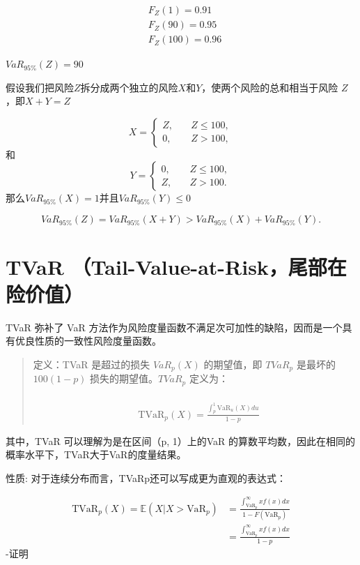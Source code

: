 \documentclass[
]{book}
\begin{document}
\[
\begin{align*}
&F_Z(1) = 0.91 \\
& F_Z(90) =  0.95\\
& F_Z(100) =  0.96
\end{align*}
\]

\(VaR_{95\%}(Z) = 90\)

假设我们把风险\(Z\)拆分成两个独立的风险\(X\)和\(Y\)，使两个风险的总和相当于风险 \(Z\)，即\(X+Y=Z\)

\[
X=\begin{cases}
Z, & \quad Z\le 100,\\
0, & \quad Z> 100,
\end{cases}
\] 和 \[
Y=\begin{cases}
0, & \quad Z\le 100,\\
Z, & \quad Z> 100.
\end{cases}
\] 那么\(VaR_{95\%}(X) = 1\)并且\(VaR_{95\%}(Y) \le 0\)

\[
VaR_{95\%}(Z) = VaR_{95\%}(X+Y) > VaR_{95\%}(X) + VaR_{95\%}(Y).
\]

\hypertarget{tvar-tail-value-at-riskux5c3eux90e8ux5728ux9669ux4ef7ux503c}{%
\section{TVaR （Tail-Value-at-Risk，尾部在险价值）}\label{tvar-tail-value-at-riskux5c3eux90e8ux5728ux9669ux4ef7ux503c}}

TVaR 弥补了 VaR 方法作为风险度量函数不满足次可加性的缺陷，因而是一个具有优良性质的一致性风险度量函数。

\begin{quote}
定义：TVaR 是超过的损失 \(VaR_p(X)\) 的期望值，即 \(TVaR_p\) 是最坏的 \(100(1-p)%
\) 损失的期望值。\(TVaR_p\) 定义为：

\[
\begin{align*}
&  \\ 
& \text{TVa}{{\text{R}}_{p}}(X)=\frac{\int_{p}^{1}{\text{Va}{{\text{R}}_{u}}(X)du}}{1-p}  
\end{align*}
\]
\end{quote}

其中，TVaR 可以理解为是在区间（p, 1）上的VaR 的算数平均数，因此在相同的概率水平下，TVaR大于VaR的度量结果。

性质: 对于连续分布而言，TVaRp还可以写成更为直观的表达式：

\[
\begin{align*}
\text{TVa}{{\text{R}}_{p}}(X)
=\mathbb{E}(X|X>\text{Va}{{\text{R}}_{p}})
&= \frac{\int_{\text{Va}{{\text{R}}_{p}}}^{\infty }{xf(x)dx}}{1-F(\text{Va}{{\text{R}}_{p}})}\\
&=\frac{\int_{\text{Va}{{\text{R}}_{p}}}^{\infty }{xf(x)dx}}{1-p}
\end{align*}
\]
-证明
\end{document}
